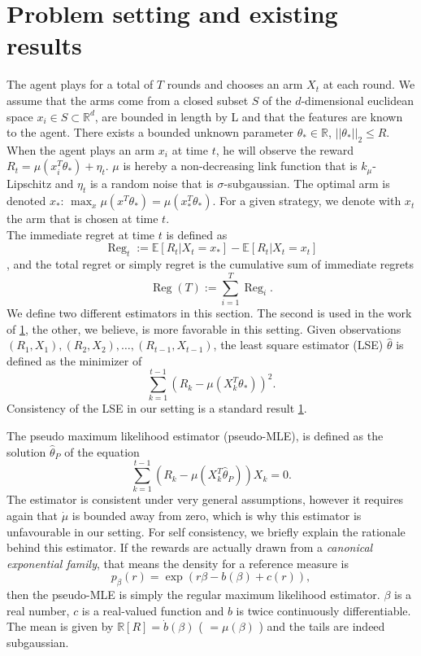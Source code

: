 \documentclass[twoside]{article} \usepackage{aistats2017}
\newcommand{\Reg} {
  \operatorname{Reg}}
\begin{document}
\section{Problem setting and existing results}
The agent plays for a total of $T$ rounds and chooses an arm $X_t$ at each round. 
We assume that the arms come from a closed subset $S$ of the $d$-dimensional euclidean space $x_i \in S\subset\mathbb{R}^d$, are bounded in length by L and that the features are known to the agent.
There exists a bounded unknown parameter $\theta_*\in \mathbb{R}$, $||\theta_*||_2 \leq R$.
When the agent plays an arm $x_i$ at time $t$, he will observe the reward $R_t = \mu(x_i^T\theta_*) +\eta_t$. $\mu$ is hereby a non-decreasing link function that is $k_\mu$-Lipschitz and $\eta_t$ is a random noise that is $\sigma$-subgaussian. The optimal arm is denoted $x_*$: $\max_x\mu(x^T\theta_*) = \mu(x_*^T\theta_*)$. For a given strategy, we denote with $x_t$ the arm that is chosen at time $t$.\\
The immediate regret at time $t$ is defined as 
$$\Reg_t := \mathbb{E}\left[R_t|X_t=x_*\right]-\mathbb{E}\left[R_t|X_t=x_t\right]$$,
and the total regret or simply regret is the cumulative sum of immediate regrets
$$\Reg(T) := \sum_{i=1}^T \Reg_i.$$
We define two different estimators in this section.
The second is used in the work of \ref{}, the other, we believe, is more favorable in this setting.
Given observations $(R_1,X_1), (R_2,X_2),\ldots,(R_{t-1},X_{t-1})$, the least square estimator (LSE) $\hat{\theta}$ is defined as the minimizer of
$$\sum_{k=1}^{t-1}\left(R_k - \mu(X_k^T\theta_*)\right)^2.$$
Consistency of the LSE in our setting is a standard result \ref{}.

The pseudo maximum likelihood estimator (pseudo-MLE), is defined as the solution $\hat{\theta}_P$ of the equation
$$\sum_{k=1}^{t-1}(R_k-\mu(X_k^T\hat{\theta}_P))X_k = 0.$$
The estimator is consistent under very general assumptions, however it requires again that $\dot{\mu}$ is bounded away from zero, which is why this estimator is unfavourable in our setting.
For self consistency, we briefly explain the rationale behind this estimator.
If the rewards are actually drawn from a \textit{canonical exponential family}, that means the density for a reference measure is
$$p_\beta(r) = \exp(r\beta − b(\beta) + c(r)) ,$$
then the pseudo-MLE is simply the regular maximum likelihood estimator. $\beta$ is a real number, $c$ is a real-valued function and $b$ is twice continuously differentiable. The mean is given by $\mathbb{R}[R] = \dot{b}(\beta)$ ( $=\mu(\beta)$ ) and the tails are indeed subgaussian. 
\end{document}

